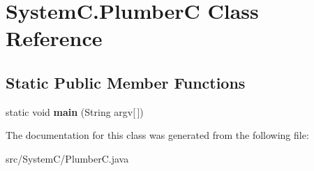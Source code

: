 \hypertarget{class_system_c_1_1_plumber_c}{}\section{System\+C.\+Plumber\+C Class Reference}
\label{class_system_c_1_1_plumber_c}
\subsection*{Static Public Member Functions}
\begin{DoxyCompactItemize}
\item 
\hypertarget{class_system_c_1_1_plumber_c_a0f34e6865c714f1ae7ff5fd3d8790d27}{}static void {\bfseries main} (String argv\mbox{[}$\,$\mbox{]})\label{class_system_c_1_1_plumber_c_a0f34e6865c714f1ae7ff5fd3d8790d27}

\end{DoxyCompactItemize}


The documentation for this class was generated from the following file\+:\begin{DoxyCompactItemize}
\item 
src/\+System\+C/Plumber\+C.\+java\end{DoxyCompactItemize}
